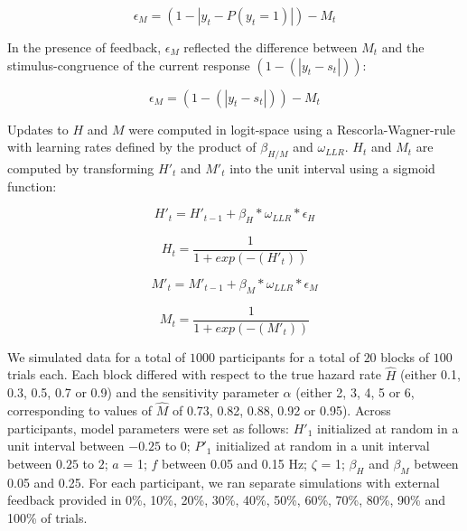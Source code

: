 \documentclass[
]{article}
\begin{document}
\begin{equation}
\epsilon_M = (1-|y_t - P(y_t = 1)|) - M_t
\end{equation}

In the presence of feedback, \(\epsilon_M\) reflected the difference
between \(M_t\) and the stimulus-congruence of the current response
\((1- (|y_t - s_t|))\):

\begin{equation}
\epsilon_M = (1- (|y_t - s_t|)) - M_t
\end{equation}

Updates to \(H\) and \(M\) were computed in logit-space using a
Rescorla-Wagner-rule with learning rates defined by the product of
\(\beta_{H/M}\) and \(\omega_{LLR}\). \(H_t\) and \(M_t\) are computed
by transforming \(H'_t\) and \(M'_t\) into the unit interval using a
sigmoid function:

\begin{equation}
H'_t = H'_{t-1} + \beta_H *\omega_{LLR} * \epsilon_H
\end{equation}

\begin{equation}
H_t = \frac{1}{1+exp(-(H'_t))}
\end{equation}

\begin{equation}
M'_t = M'_{t-1} + \beta_M *\omega_{LLR} * \epsilon_M
\end{equation}

\begin{equation}
M_t = \frac{1}{1+exp(-(M'_t))}
\end{equation}

We simulated data for a total of \(1000\) participants for a total of
\(20\) blocks of \(100\) trials each. Each block differed with respect
to the true hazard rate \(\hat{H}\) (either 0.1, 0.3, 0.5, 0.7 or 0.9)
and the sensitivity parameter \(\alpha\) (either 2, 3, 4, 5 or 6,
corresponding to values of \(\hat{M}\) of 0.73, 0.82, 0.88, 0.92 or
0.95). Across participants, model parameters were set as follows:
\(H'_1\) initialized at random in a unit interval between \(-0.25\) to
\(0\); \(P'_1\) initialized at random in a unit interval between
\(0.25\) to \(2\); \(a\) = 1; \(f\) between 0.05 and 0.15 Hz; \(\zeta\)
= 1; \(\beta_H\) and \(\beta_M\) between 0.05 and 0.25. For each
participant, we ran separate simulations with external feedback provided
in 0\%, 10\%, 20\%, 30\%, 40\%, 50\%, 60\%, 70\%, 80\%, 90\% and 100\%
of trials.

\newpage
\end{document}
